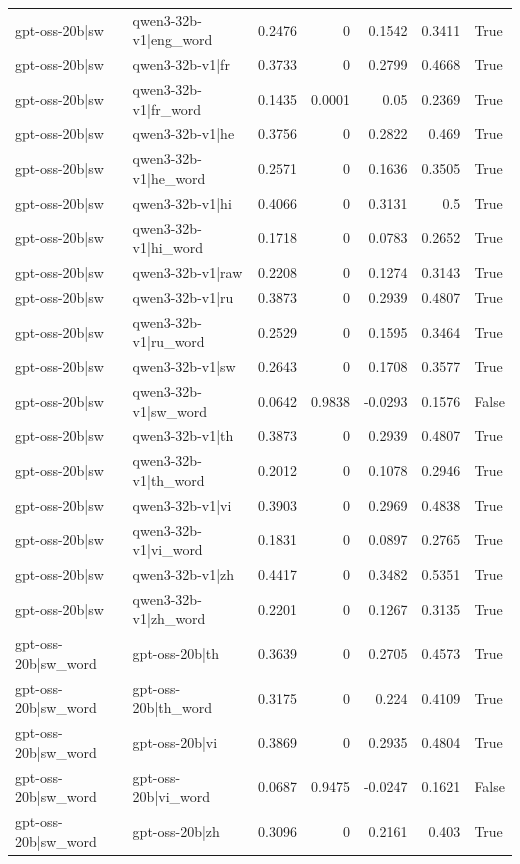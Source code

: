 \begin{table}
\begin{tabular}{l l r r r r l}
gpt-oss-20b|sw & qwen3-32b-v1|eng_word & 0.2476 & 0 & 0.1542 & 0.3411 & True \\
gpt-oss-20b|sw & qwen3-32b-v1|fr & 0.3733 & 0 & 0.2799 & 0.4668 & True \\
gpt-oss-20b|sw & qwen3-32b-v1|fr_word & 0.1435 & 0.0001 & 0.05 & 0.2369 & True \\
gpt-oss-20b|sw & qwen3-32b-v1|he & 0.3756 & 0 & 0.2822 & 0.469 & True \\
gpt-oss-20b|sw & qwen3-32b-v1|he_word & 0.2571 & 0 & 0.1636 & 0.3505 & True \\
gpt-oss-20b|sw & qwen3-32b-v1|hi & 0.4066 & 0 & 0.3131 & 0.5 & True \\
gpt-oss-20b|sw & qwen3-32b-v1|hi_word & 0.1718 & 0 & 0.0783 & 0.2652 & True \\
gpt-oss-20b|sw & qwen3-32b-v1|raw & 0.2208 & 0 & 0.1274 & 0.3143 & True \\
gpt-oss-20b|sw & qwen3-32b-v1|ru & 0.3873 & 0 & 0.2939 & 0.4807 & True \\
gpt-oss-20b|sw & qwen3-32b-v1|ru_word & 0.2529 & 0 & 0.1595 & 0.3464 & True \\
gpt-oss-20b|sw & qwen3-32b-v1|sw & 0.2643 & 0 & 0.1708 & 0.3577 & True \\
gpt-oss-20b|sw & qwen3-32b-v1|sw_word & 0.0642 & 0.9838 & -0.0293 & 0.1576 & False \\
gpt-oss-20b|sw & qwen3-32b-v1|th & 0.3873 & 0 & 0.2939 & 0.4807 & True \\
gpt-oss-20b|sw & qwen3-32b-v1|th_word & 0.2012 & 0 & 0.1078 & 0.2946 & True \\
gpt-oss-20b|sw & qwen3-32b-v1|vi & 0.3903 & 0 & 0.2969 & 0.4838 & True \\
gpt-oss-20b|sw & qwen3-32b-v1|vi_word & 0.1831 & 0 & 0.0897 & 0.2765 & True \\
gpt-oss-20b|sw & qwen3-32b-v1|zh & 0.4417 & 0 & 0.3482 & 0.5351 & True \\
gpt-oss-20b|sw & qwen3-32b-v1|zh_word & 0.2201 & 0 & 0.1267 & 0.3135 & True \\
gpt-oss-20b|sw_word & gpt-oss-20b|th & 0.3639 & 0 & 0.2705 & 0.4573 & True \\
gpt-oss-20b|sw_word & gpt-oss-20b|th_word & 0.3175 & 0 & 0.224 & 0.4109 & True \\
gpt-oss-20b|sw_word & gpt-oss-20b|vi & 0.3869 & 0 & 0.2935 & 0.4804 & True \\
gpt-oss-20b|sw_word & gpt-oss-20b|vi_word & 0.0687 & 0.9475 & -0.0247 & 0.1621 & False \\
gpt-oss-20b|sw_word & gpt-oss-20b|zh & 0.3096 & 0 & 0.2161 & 0.403 & True \\

\end{tabular}
\end{table}
